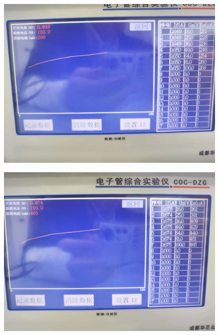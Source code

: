 \documentclass[UTF8]{article}
\begin{document}
\begin{appendix}
\begin{figure}[H]
            	\includegraphics[clip,scale=0.2,trim={0 0 0 0}]{fig/fig18.jpg}
            	\label{figure.15}
\end{figure}
\begin{figure}[H]
            	\centering
            	\includegraphics[clip,scale=0.2,trim={0 0 0 0}]{fig/fig19.jpg}
            	\label{figure.15}
\end{figure}
\begin{figure}[H]
            	\centering

\end{figure}
\end{appendix}
\end{document}
